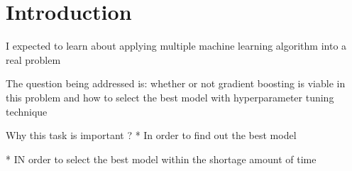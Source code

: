 \documentclass[journal,twocolumn,letterpaper]{IEEEJERM}
\begin{document}
\section{Introduction}
% 
% 
% 
% 

I expected to learn about applying multiple machine learning algorithm into a real problem

The question being addressed is: whether or not gradient boosting is viable in this problem and how to select the best model with hyperparameter tuning technique

Why this task is important ? 
* In order to find out the best model

* IN order to select the best model within the shortage amount of time

%
%

\end{document}
